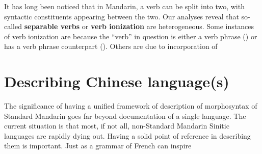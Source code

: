 \documentclass[UTF8, a4paper, oneside, scheme=plain, 12pt]{ctexrep}
\newcommand*{\concept}[1]{\textbf{#1}}
\begin{document}
It has long been noticed that in Mandarin,
a verb can be split into two, with syntactic constituents appearing between the two.
Our analyses reveal that so-called \concept{separable verbs} or \concept{verb ionization} are heterogeneous.
Some instances of verb ionization are because the ``verb'' in question
is either a verb phrase () or has a verb phrase counterpart ().
Others are due to incorporation of 

\section{Describing Chinese language(s)}

The significance of having a unified framework of description of morphosyntax of Standard Mandarin
goes far beyond documentation of a single language.
The current situation is that most, if not all, non-Standard Mandarin Sinitic languages
are rapidly dying out.
Having a solid point of reference in describing them is important.
Just as a grammar of French can inspire 

\printbibliography
\end{document}
